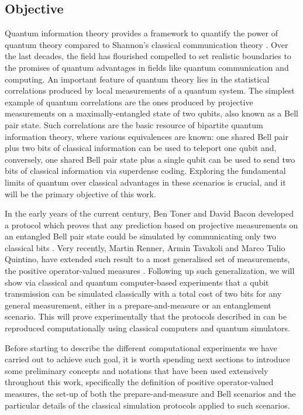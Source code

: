 \subsection{Objective}
Quantum information theory provides a framework to quantify the power of quantum theory compared to Shannon's classical communication theory \cite{shannon}. Over the last decades, the field has flourished compelled to set realistic boundaries to the promises of quantum advantages in fields like quantum communication and computing. An important feature of quantum theory lies in the statistical correlations produced by local measurements of a quantum system. The simplest example of quantum correlations are the ones produced by projective measurements on a maximally-entangled state of two qubits, also known as a Bell pair state. Such correlations are the basic resource of bipartite quantum information theory, where various equivalences are known: one shared Bell pair plus two bits of classical information can be used to teleport one  qubit and, conversely, one shared Bell pair state plus a single qubit can be used to send two bits of classical information via superdense coding. Exploring the fundamental limits of quantum over classical advantages in these scenarios is crucial, and it will be the primary objective of this work.
\par
In the early years of the current century, Ben Toner and David Bacon developed a protocol which proves that any prediction based on projective measurements on an entangled Bell pair state could be simulated by communicating only two classical bits \cite{toner2003}. Very recently, Martin Renner, Armin Tavakoli and Marco Tulio Quintino, have extended such result to a most generalised set of measurements, the positive operator-valued measures \cite{renner2022}.
Following up such generalization, we will show via classical and quantum computer-based experiments that a qubit transmission can be simulated classically with a total cost of two bits for any general measurement, either in a prepare-and-measure or an entanglement scenario. This will prove experimentally that the protocols described in \cite{renner2022} can be reproduced computationally using classical computers and quantum simulators.
\par
Before starting to describe the different computational experiments we have carried out to achieve such goal, it is worth spending next sections to introduce some preliminary concepts and notations that have been used extensively throughout this work, specifically the definition of positive operator-valued measures, the set-up of both the prepare-and-measure and Bell scenarios and the particular details of the classical simulation protocols applied to such scenarios.
\par
